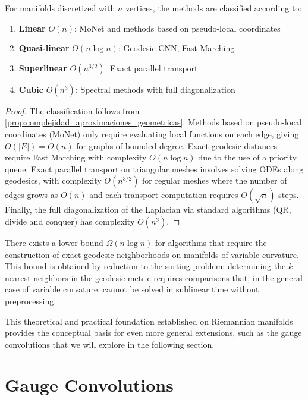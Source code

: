 \begin{proposition}\label{prop:jerarquia_complejidades}
For manifolds discretized with $n$ vertices, the methods are classified according to:
\begin{enumerate}
    \item \textbf{Linear} $O(n)$: MoNet and methods based on pseudo-local coordinates
    \item \textbf{Quasi-linear} $O(n \log n)$: Geodesic CNN, Fast Marching
    \item \textbf{Superlinear} $O(n^{3/2})$: Exact parallel transport
    \item \textbf{Cubic} $O(n^3)$: Spectral methods with full diagonalization
\end{enumerate}
\end{proposition}

\begin{proof}
The classification follows from \autoref{prop:complejidad_aproximaciones_geometricas}. Methods based on pseudo-local coordinates (MoNet) only require evaluating local functions on each edge, giving $O(|E|) = O(n)$ for graphs of bounded degree. Exact geodesic distances require Fast Marching with complexity $O(n \log n)$ due to the use of a priority queue. Exact parallel transport on triangular meshes involves solving ODEs along geodesics, with complexity $O(n^{3/2})$ for regular meshes where the number of edges grows as $O(n)$ and each transport computation requires $O(\sqrt{n})$ steps. Finally, the full diagonalization of the Laplacian via standard algorithms (QR, divide and conquer) has complexity $O(n^3)$.
\end{proof}

\begin{remark}
There exists a lower bound $\Omega(n \log n)$ for algorithms that require the construction of exact geodesic neighborhoods on manifolds of variable curvature. This bound is obtained by reduction to the sorting problem: determining the $k$ nearest neighbors in the geodesic metric requires comparisons that, in the general case of variable curvature, cannot be solved in sublinear time without preprocessing.
\end{remark}

This theoretical and practical foundation established on Riemannian manifolds provides the conceptual basis for even more general extensions, such as the gauge convolutions that we will explore in the following section.
\section{Gauge Convolutions}\label{sec:gauge_cnns}

